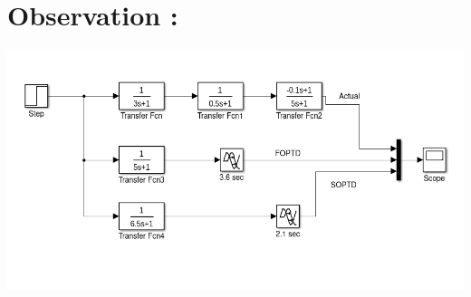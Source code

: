\message{ !name(lab1.tex)}\documentclass[a4paper,12pt,openany]{book}
\begin{document}
 \section{Observation : }
 \begin{subfigure}
\begin{center}
  \includegraphics[width=165mm, scale=0.95]{lab04part10.png}
  \caption{Simulink model of systems given is Part A}
\end{center}
\end{subfigure}
\end{document}
